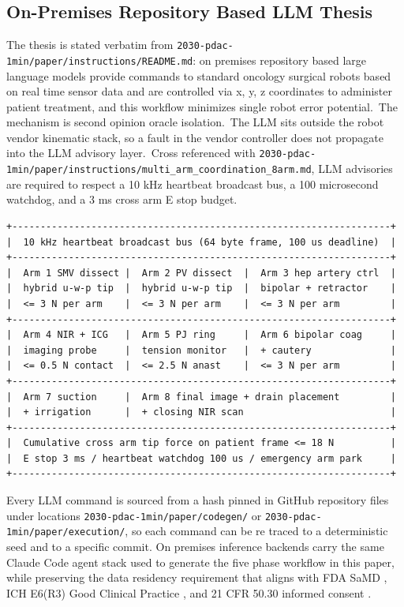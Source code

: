 \subsection{On-Premises Repository Based LLM Thesis}
\label{sec:intro-thesis}

The thesis is stated verbatim from
\texttt{2030-pdac-1min/paper/instructions/README.md}: on premises
repository based large language models provide commands to
standard oncology surgical robots based on real time sensor data
and are controlled via x, y, z coordinates to administer patient
treatment, and this workflow minimizes single robot error
potential.\ The mechanism is second opinion oracle isolation.\ The
LLM sits outside the robot vendor kinematic stack, so a fault in
the vendor controller does not propagate into the LLM advisory
layer.\ Cross referenced with
\texttt{2030-pdac-1min/paper/instructions/multi_arm_coordination_8arm.md},
LLM advisories are required to respect a 10 kHz heartbeat
broadcast bus, a 100 microsecond watchdog, and a 3 ms cross arm E
stop budget.

\clearpage

\begin{verbatim}
+-------------------------------------------------------------------+
|  10 kHz heartbeat broadcast bus (64 byte frame, 100 us deadline)  |
+-------------------------------------------------------------------+
|  Arm 1 SMV dissect |  Arm 2 PV dissect  |  Arm 3 hep artery ctrl  |
|  hybrid u-w-p tip  |  hybrid u-w-p tip  |  bipolar + retractor    |
|  <= 3 N per arm    |  <= 3 N per arm    |  <= 3 N per arm         |
+-------------------------------------------------------------------+
|  Arm 4 NIR + ICG   |  Arm 5 PJ ring     |  Arm 6 bipolar coag     |
|  imaging probe     |  tension monitor   |  + cautery              |
|  <= 0.5 N contact  |  <= 2.5 N anast    |  <= 3 N per arm         |
+-------------------------------------------------------------------+
|  Arm 7 suction     |  Arm 8 final image + drain placement         |
|  + irrigation      |  + closing NIR scan                          |
+-------------------------------------------------------------------+
|  Cumulative cross arm tip force on patient frame <= 18 N          |
|  E stop 3 ms / heartbeat watchdog 100 us / emergency arm park     |
+-------------------------------------------------------------------+
\end{verbatim}
 

Every LLM command is sourced from a hash pinned in GitHub repository files under locations
\texttt{2030-pdac-1min/paper/codegen/} or
\texttt{2030-pdac-1min/paper/execution/}, so each command can be
re traced to a deterministic seed and to a specific commit.
On premises inference backends carry the same Claude Code agent stack
\cite{claude-code, claude-opus-47, claude-sonnet-46} used to
generate the five phase workflow in this paper, while preserving
the data residency requirement that aligns with FDA SaMD
\cite{fda-samd}, ICH E6(R3) Good Clinical Practice
\cite{ich-e6r3}, and 21 CFR 50.30 informed consent
\cite{cfr-21-50-30}.

